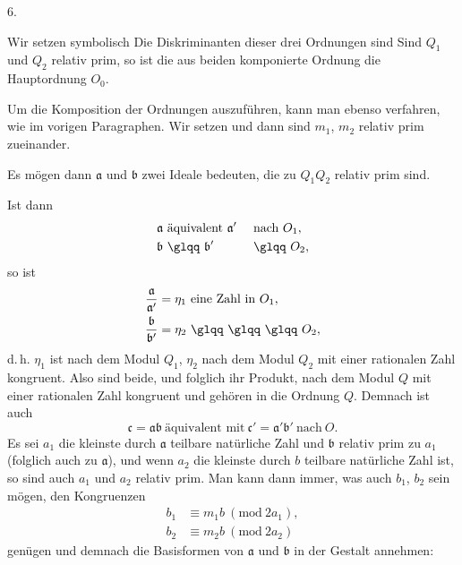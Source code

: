 6. 

Wir setzen symbolisch
Die Diskriminanten dieser drei Ordnungen sind
Sind $Q_1$ und $Q_2$ relativ prim, so ist die aus beiden komponierte Ordnung die Hauptordnung $O_0$.

Um die Komposition der Ordnungen auszuführen, kann man ebenso verfahren, wie im vorigen Paragraphen. Wir setzen
und dann sind $m_1$, $m_2$ relativ prim zueinander.

Es mögen dann $\mathfrak{a}$ und $\mathfrak{b}$ zwei Ideale bedeuten, die zu $Q_1 Q_2$ relativ prim sind.

Ist dann
\[
\begin{aligned}
\mathfrak{a}&\ \text{äquivalent}\ \mathfrak{a}'&&\ \text{nach}\ O_1,\\
\mathfrak{b}&\ \text{\glqq}\ \mathfrak{b}'&&\ \text{\glqq}\ O_2,
\end{aligned}
\]
so ist
\[
\begin{aligned}
\frac{\mathfrak{a}}{\mathfrak{a}'}&=\eta_1\ \text{eine Zahl in}\ O_1,\\
\frac{\mathfrak{b}}{\mathfrak{b}'}&=\eta_2\ \text{\glqq}\ \text{\glqq}\ \text{\glqq}\ O_2,
\end{aligned}
\]
d.\,h. $\eta_1$ ist nach dem Modul $Q_1$, $\eta_2$ nach dem Modul $Q_2$ mit einer rationalen Zahl kongruent. Also sind beide, und folglich ihr Produkt, nach dem Modul $Q$ mit einer rationalen Zahl kongruent und gehören in die Ordnung $Q$. %
Demnach ist auch
\[
\mathfrak{c} = \mathfrak{a}\mathfrak{b} \ \text{äquivalent mit} \ \mathfrak{c}' = \mathfrak{a}'\mathfrak{b}' \ \text{nach} \ O.
\]
Es sei $a_1$ die kleinste durch $\mathfrak{a}$ teilbare natürliche Zahl und $\mathfrak{b}$ relativ prim zu $a_1$ (folglich auch zu $\mathfrak{a}$), und wenn $a_2$ die kleinste durch $b$ teilbare natürliche Zahl ist, so sind auch $a_1$ und $a_2$ relativ prim. %
Man kann dann immer, was auch $b_1$, $b_2$ sein mögen, den Kongruenzen
\[
\begin{aligned}
b_1 &\equiv m_1 b \ (\mathrm{mod}\ 2a_1),\\
b_2 &\equiv m_2 b \ (\mathrm{mod}\ 2a_2)
\end{aligned}
\]
genügen und demnach die Basisformen von $\mathfrak{a}$ und $\mathfrak{b}$ in der Gestalt annehmen:
